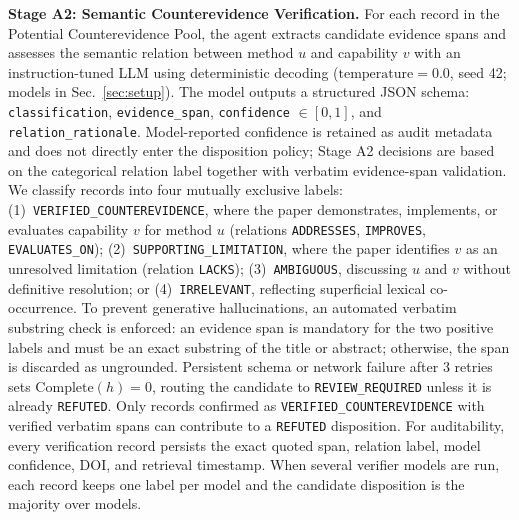 \documentclass[runningheads]{llncs}
\begin{document}
\noindent\textbf{Stage A2: Semantic Counterevidence Verification.} For each record in the Potential Counterevidence Pool, the agent extracts candidate evidence spans and assesses the semantic relation between method $u$ and capability $v$ with an instruction-tuned LLM using deterministic decoding ($\text{temperature} = 0.0$, seed 42; models in Sec.~\ref{sec:setup}). The model outputs a structured JSON schema: \texttt{classification}, \texttt{evidence\_}\allowbreak\texttt{span}, \texttt{confidence} $\in [0, 1]$, and \texttt{relation\_}\allowbreak\texttt{rationale}. Model-reported confidence is retained as audit metadata and does not directly enter the disposition policy; Stage A2 decisions are based on the categorical relation label together with verbatim evidence-span validation. We classify records into four mutually exclusive labels: (1)~\texttt{VERIFIED\_}\allowbreak\texttt{COUNTEREVIDENCE}, where the paper demonstrates, implements, or evaluates capability $v$ for method $u$ (relations \texttt{ADDRESSES}, \texttt{IMPROVES}, \texttt{EVALUATES\_}\allowbreak\texttt{ON}); (2)~\texttt{SUPPORTING\_}\allowbreak\texttt{LIMITATION}, where the paper identifies $v$ as an unresolved limitation (relation \texttt{LACKS}); (3)~\texttt{AMBIGUOUS}, discussing $u$ and $v$ without definitive resolution; or (4)~\texttt{IRRELEVANT}, reflecting superficial lexical co-occurrence. To prevent generative hallucinations, an automated verbatim substring check is enforced: an evidence span is mandatory for the two positive labels and must be an exact substring of the title or abstract; otherwise, the span is discarded as ungrounded. Persistent schema or network failure after 3 retries sets $\text{Complete}(h) = 0$, routing the candidate to \texttt{REVIEW\_REQUIRED} unless it is already \texttt{REFUTED}. Only records confirmed as \texttt{VERIFIED\_}\allowbreak\texttt{COUNTEREVIDENCE} with verified verbatim spans can contribute to a \texttt{REFUTED} disposition. For auditability, every verification record persists the exact quoted span, relation label, model confidence, DOI, and retrieval timestamp. When several verifier models are run, each record keeps one label per model and the candidate disposition is the majority over models.
\end{document}

